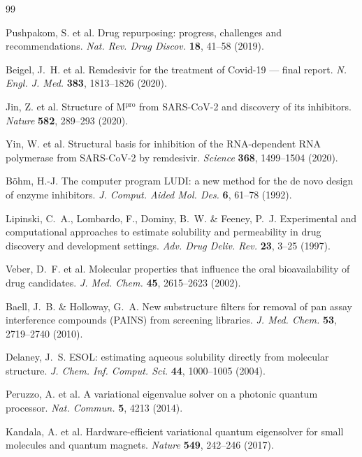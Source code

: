 \documentclass[10pt,a4paper,twocolumn]{article}
\begin{document}
\begin{thebibliography}{99}
\footnotesize
\setlength{\itemsep}{1.5pt}

 Pushpakom, S. et al. Drug repurposing: progress, challenges and
recommendations. \emph{Nat. Rev. Drug Discov.} \textbf{18}, 41--58 (2019).

 Beigel, J.~H. et al. Remdesivir for the treatment of Covid-19 ---
final report. \emph{N. Engl. J. Med.} \textbf{383}, 1813--1826 (2020).

 Jin, Z. et al. Structure of M$^{\text{pro}}$ from SARS-CoV-2 and
discovery of its inhibitors. \emph{Nature} \textbf{582}, 289--293 (2020).

 Yin, W. et al. Structural basis for inhibition of the RNA-dependent
RNA polymerase from SARS-CoV-2 by remdesivir. \emph{Science} \textbf{368},
1499--1504 (2020).

 B\"ohm, H.-J. The computer program LUDI: a new method for the de novo
design of enzyme inhibitors. \emph{J. Comput. Aided Mol. Des.} \textbf{6}, 61--78 (1992).

 Lipinski, C.~A., Lombardo, F., Dominy, B.~W. \& Feeney, P.~J.
Experimental and computational approaches to estimate solubility and permeability in
drug discovery and development settings. \emph{Adv. Drug Deliv. Rev.} \textbf{23},
3--25 (1997).

 Veber, D.~F. et al. Molecular properties that influence the oral
bioavailability of drug candidates. \emph{J. Med. Chem.} \textbf{45}, 2615--2623 (2002).

 Baell, J.~B. \& Holloway, G.~A. New substructure filters for removal
of pan assay interference compounds (PAINS) from screening libraries. \emph{J. Med.
Chem.} \textbf{53}, 2719--2740 (2010).

 Delaney, J.~S. ESOL: estimating aqueous solubility directly from
molecular structure. \emph{J. Chem. Inf. Comput. Sci.} \textbf{44}, 1000--1005 (2004).

 Peruzzo, A. et al. A variational eigenvalue solver on a photonic
quantum processor. \emph{Nat. Commun.} \textbf{5}, 4213 (2014).

 Kandala, A. et al. Hardware-efficient variational quantum
eigensolver for small molecules and quantum magnets. \emph{Nature} \textbf{549},
242--246 (2017).


\end{thebibliography}
\end{document}
